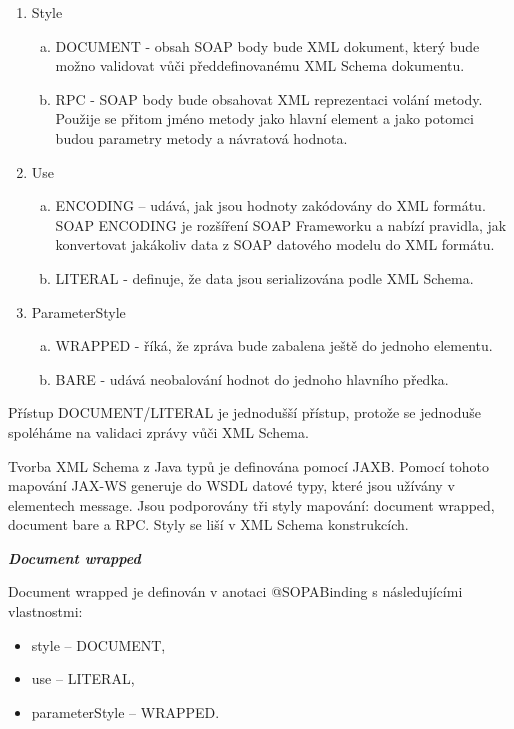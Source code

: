 \documentclass[11pt,twoside,a4paper]{book}
\begin{document}
\begin{enumerate}
  \item Style
  	\begin{enumerate}[(a)]
  	  \item DOCUMENT - obsah SOAP body bude XML dokument, který bude
možno validovat vůči předdefinovanému XML Schema dokumentu.
  	  \item RPC - SOAP body bude obsahovat XML reprezentaci volání metody.
Použije se přitom jméno metody jako hlavní element a jako potomci budou
parametry metody a návratová hodnota.
	\end{enumerate}
  \item Use
	\begin{enumerate}[(a)]
	  \item ENCODING – udává, jak jsou hodnoty zakódovány do XML formátu.
SOAP ENCODING je rozšíření SOAP Frameworku a nabízí pravidla, jak
konvertovat jakákoliv data z SOAP datového modelu do XML formátu.
	  \item LITERAL - definuje, že data jsou serializována podle XML Schema.
	\end{enumerate}
  \item ParameterStyle
	\begin{enumerate}[(a)]
	  \item WRAPPED - říká, že zpráva bude zabalena ještě do jednoho elementu.
	  \item BARE - udává neobalování hodnot do jednoho hlavního předka.
	\end{enumerate}
\end{enumerate}

Přístup DOCUMENT/LITERAL je jednodušší přístup, protože se jednoduše spoléháme na
validaci zprávy vůči XML Schema.

Tvorba XML Schema z Java typů je definována pomocí JAXB. Pomocí tohoto mapování
JAX-WS generuje do WSDL datové typy, které jsou užívány v elementech message. Jsou
podporovány tři styly mapování: document wrapped, document bare a RPC. Styly se liší v
XML Schema konstrukcích.

\textbf{\textit{Document wrapped}}

Document wrapped je definován v anotaci @SOPABinding s následujícími vlastnostmi:

\begin{itemize}
  \item style – DOCUMENT,
  \item use – LITERAL,
  \item parameterStyle – WRAPPED.
\end{itemize}
\end{document}
